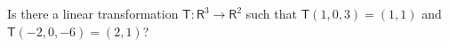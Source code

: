 Is there a linear transformation $\mathsf{T}\colon\mathsf{R}^3 \to
\mathsf{R}^2$ such that $\mathsf{T}(1,0,3) = (1,1)$ and
$\mathsf{T}(-2,0,-6) = (2,1)$?
